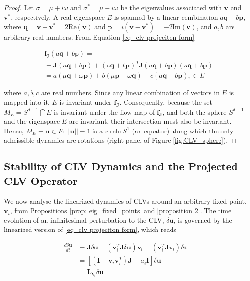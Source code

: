 \documentclass[aps,reprint,prx]{revtex4-2}
\begin{document}
\begin{proof}
Let $\sigma = \mu + i\omega$ and ${\sigma}^* = \mu - i\omega$ be the eigenvalues associated with $\mathbf{v}$ and ${\mathbf{v}^*}$, respectively. A real eigenspace $E$ is spanned by a linear combination $a\mathbf{q}+b\mathbf{p}$, where $\mathbf{q} = \mathbf{v} + \mathbf{v}^* = 2\mathrm{Re}(\mathbf{v})$ and $\mathbf{p} = i(\mathbf{v} - {\mathbf{v}}^*)=-2\mathrm{Im}(\mathbf{v})$, and $a,b$ are arbitrary real numbers.
From Equation \eqref{eq_clv projeciton form}

\begin{align}
&\mathbf{f_J}(a\mathbf{q} + b\mathbf{p}) = \nonumber \\ 
&=\mathbf{J} (a\mathbf{q} + b\mathbf{p}) +(a\mathbf{q}+ b\mathbf{p})^T\mathbf{J}(a\mathbf{q} + b\mathbf{p}) (a\mathbf{q} + b\mathbf{p})\nonumber \\ 
&= a(\mu \mathbf{q} + \omega\mathbf{p}) + b(\mu \mathbf{p} - \omega\mathbf{q}) + c(a\mathbf{q} + b\mathbf{p}) , \in E
\end{align}

where $a,b,c$ are real numbers. Since any linear combination of vectors in $E$ is mapped into it, $E$ is invariant under $\mathbf{f_J}$.
Consequently, because the set $M_E = S^{d-1} \bigcap E$ is invariant under the flow map of $\mathbf{f_J}$, and both the sphere $S^{d-1}$ and the eigenspace $E$ are invariant, their intersection must also be invariant.
Hence, $M_E = { \mathbf{u} \in E: ||\mathbf{u}|| = 1 }$ is a circle $S^1$ (an equator) along which the only admissible dynamics are rotations (right panel of Figure \ref{fig:CLV_sphere}).
\end{proof}

\subsection{Stability of CLV Dynamics and the Projected CLV Operator}
\label{subsection::linear_stability}

We now analyse the linearized dynamics of CLVs around an arbitrary fixed point, $\mathbf{v}_i$, from Propositions \ref{prop: eig_fixed_points} and \ref{proposition 2}.
The time evolution of an infinitesimal perturbation to the CLV, $\delta \mathbf{u}$, is governed by the linearized version of \eqref{eq_clv projeciton form}, which reads

\begin{align} \label{eq: full_linearized_system}
\frac{d \delta\mathbf{u}}{dt} &= \mathbf{J} \delta \mathbf{u} - \left( \mathbf{v}_i^T\mathbf{J}\delta \mathbf{u}\right)\mathbf{v}_i - \left(\mathbf{v}_i^T\mathbf{J}\mathbf{v}_i\right) \delta \mathbf{u}
\nonumber\\ &= \left[\left(\mathbf{I} - \mathbf{v}_i\mathbf{v}_i^T \right)\mathbf{J} - \mu_i\mathbf{I} \right]\delta \mathbf{u} \nonumber\\ &= \mathbf{L}_{\mathbf{v}_i}\delta \mathbf{u}
\end{align}
\end{document}
